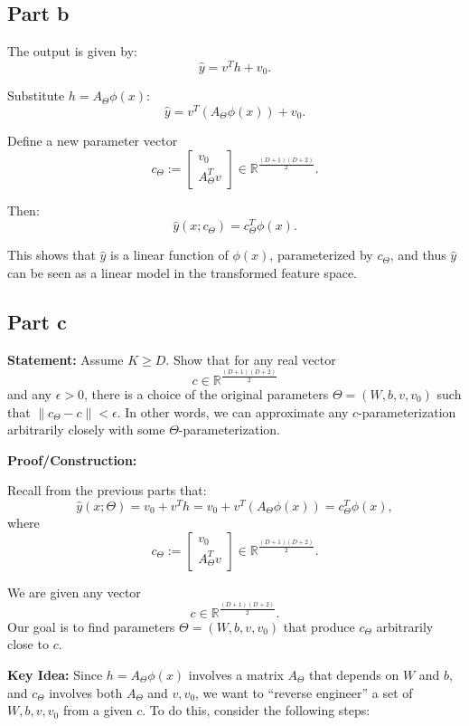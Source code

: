 \subsection{Part b}

The output is given by:
\[
\hat{y} = v^T h + v_0.
\]

Substitute $h = A_{\Theta}\phi(x)$:
\[
\hat{y} = v^T (A_{\Theta}\phi(x)) + v_0.
\]

Define a new parameter vector
\[
c_{\Theta} := \begin{bmatrix} v_0 \\ A_{\Theta}^T v \end{bmatrix} \in \mathbb{R}^{\frac{(D+1)(D+2)}{2}}.
\]

Then:
\[
\hat{y}(x; c_{\Theta}) = c_{\Theta}^T \phi(x).
\]

This shows that $\hat{y}$ is a linear function of $\phi(x)$, parameterized by $c_{\Theta}$, and thus $\hat{y}$ can be seen as a linear model in the transformed feature space.




\subsection{Part c}


\noindent \textbf{Statement:} Assume $K \geq D$. Show that for any real vector 
\[
c \in \mathbb{R}^{\frac{(D+1)(D+2)}{2}}
\]
and any $\epsilon > 0$, there is a choice of the original parameters $\Theta = (W, b, v, v_0)$ 
such that $\|c_{\Theta} - c\| < \epsilon$. In other words, we can approximate any $c$-parameterization 
arbitrarily closely with some $\Theta$-parameterization.

\medskip

\noindent \textbf{Proof/Construction:}

Recall from the previous parts that:
\[
\hat{y}(x; \Theta) = v_0 + v^T h = v_0 + v^T (A_{\Theta}\phi(x)) = c_{\Theta}^T \phi(x),
\]
where
\[
c_{\Theta} := \begin{bmatrix} v_0 \\ A_{\Theta}^T v \end{bmatrix} \in \mathbb{R}^{\frac{(D+1)(D+2)}{2}}.
\]

We are given any vector 
\[
c \in \mathbb{R}^{\frac{(D+1)(D+2)}{2}}.
\]
Our goal is to find parameters $\Theta = (W, b, v, v_0)$ that produce $c_{\Theta}$ arbitrarily close to $c$. 

\medskip

\noindent \textbf{Key Idea:}
Since $h = A_{\Theta}\phi(x)$ involves a matrix $A_{\Theta}$ that depends on $W$ and $b$, and $c_{\Theta}$ involves both $A_{\Theta}$ and $v, v_0$, we want to ``reverse engineer'' a set of $W, b, v, v_0$ from a given $c$. To do this, consider the following steps:

